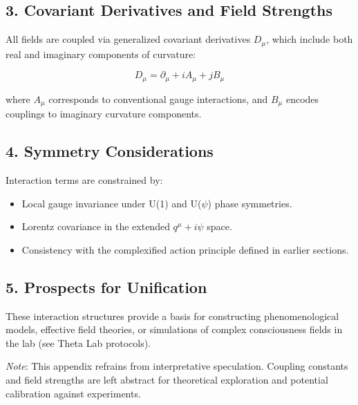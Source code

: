 \subsection*{3. Covariant Derivatives and Field Strengths}

All fields are coupled via generalized covariant derivatives $D_\mu$, which include both real and imaginary components of curvature:

\[
D_\mu = \partial_\mu + i A_\mu + j B_\mu
\]

where $A_\mu$ corresponds to conventional gauge interactions, and $B_\mu$ encodes couplings to imaginary curvature components.

\subsection*{4. Symmetry Considerations}

Interaction terms are constrained by:
\begin{itemize}
  \item Local gauge invariance under U(1) and U($\psi$) phase symmetries.
  \item Lorentz covariance in the extended $q^\mu + i \psi$ space.
  \item Consistency with the complexified action principle defined in earlier sections.
\end{itemize}

\subsection*{5. Prospects for Unification}

These interaction structures provide a basis for constructing phenomenological models, effective field theories, or simulations of complex consciousness fields in the lab (see Theta Lab protocols).

\bigskip
\textit{Note}: This appendix refrains from interpretative speculation. Coupling constants and field strengths are left abstract for theoretical exploration and potential calibration against experiments.
